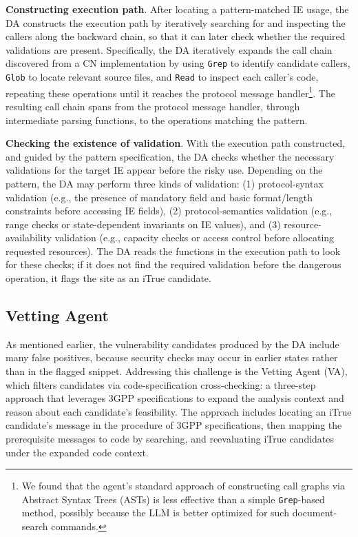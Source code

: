 \noindent\textbf{Constructing execution path}.
After locating a pattern-matched IE usage, the DA constructs the execution path by iteratively searching for and inspecting the callers along the backward chain, so that it can later check whether the required validations are present. Specifically, the DA iteratively expands the call chain discovered from a CN implementation by using \texttt{Grep} to identify candidate callers, \texttt{Glob} to locate relevant source files, and \texttt{Read} to inspect each caller's code, repeating these operations until it reaches the protocol message handler\footnote{We found that the agent's standard approach of constructing call graphs via Abstract Syntax Trees (ASTs) is less effective than a simple \texttt{Grep}-based method, possibly because the LLM is better optimized for such document-search commands.}. The resulting call chain spans from the protocol message handler, through intermediate parsing functions, to the operations matching the pattern.

\noindent\textbf{Checking the existence of validation}.
With the execution path constructed, and guided by the pattern specification, the DA checks whether the necessary validations for the target IE appear before the risky use. 
Depending on the pattern, the DA may perform three kinds of validation: (1) protocol-syntax validation (e.g., the presence of mandatory field and basic format/length constraints before accessing IE fields), (2) protocol-semantics validation (e.g., range checks or state-dependent invariants on IE values), and (3) resource-availability validation (e.g., capacity checks or access control before allocating requested resources). 
The DA reads the functions in the execution path to look for these checks; if it does not find the required validation before the dangerous operation, it flags the site as an iTrue candidate.
\subsection{Vetting Agent}
\label{sec: vetting agent}

As mentioned earlier, the vulnerability candidates produced by the DA include many false positives, because security checks may occur in earlier states rather than in the flagged snippet. 
Addressing this challenge is the Vetting Agent (VA), which filters candidates via code-specification cross-checking: a three-step approach that leverages 3GPP specifications to expand the analysis context and reason about each candidate's feasibility. The approach includes locating an iTrue candidate's message in the procedure of 3GPP specifications, then mapping the prerequisite messages to code by searching, and reevaluating iTrue candidates under the expanded code context.


